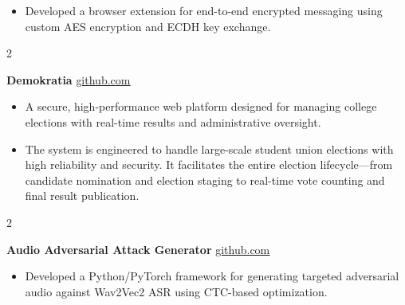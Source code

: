 \documentclass[10pt, a4paper]{article}
\newenvironment{highlights}{
    \begin{itemize}[
        topsep=0.10 cm,
        parsep=0.10 cm,
        partopsep=0pt,
        itemsep=0pt,
        leftmargin=0 cm + 10pt
    ]
}{
    \end{itemize}
} %
\newenvironment{twocolentry}[2][]{
    \onecolentry
    \def\secondColumn{#2}
    \setcolumnwidth{\fill, 4.5 cm}
    \begin{paracol}{2}
}{
    \switchcolumn \raggedleft \secondColumn
    \end{paracol}
    \endonecolentry
} %
\begin{document}
        \vspace{0.01 cm}
        
            \begin{highlights}
                \item Developed a browser extension for end-to-end encrypted messaging using custom AES encryption and ECDH key exchange.

            \end{highlights}

        \vspace{0.01 cm}
            
            \begin{twocolentry}{
            \href{https://github.com/TimsTittus/Demokratia}{\underline{github.com}}
        }
            \textbf{Demokratia}\end{twocolentry}

        \vspace{0.01 cm}
        
            \begin{highlights}
                \item A secure, high-performance web platform designed for managing college elections with real-time results and administrative oversight.
                \item The system is engineered to handle large-scale student union elections with high reliability and security. It facilitates the entire election lifecycle—from candidate nomination and election staging to real-time vote counting and final result publication.

            \end{highlights}

        \vspace{0.01 cm}
        
            \begin{twocolentry}{
            \href{https://github.com/TimsTittus/Audio-Adversarial-Attack-Generator}{\underline{github.com}}
        }
            \textbf{Audio Adversarial Attack Generator}\end{twocolentry}

        \vspace{0.01 cm}
        
            \begin{highlights}
                \item Developed a Python/PyTorch framework for generating targeted adversarial audio against Wav2Vec2 ASR using CTC-based optimization.
            \end{highlights}
\end{document}

